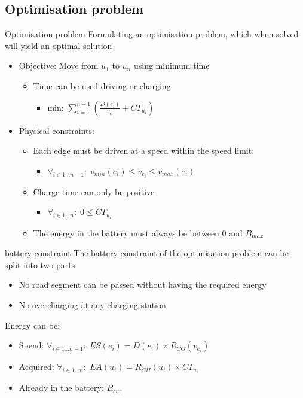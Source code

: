 \subsection{Optimisation problem}
\begin{frame}{Optimisation problem}
Formulating an optimisation problem, which when solved will yield an optimal solution
\begin{itemize}
\item Objective: Move from $u_1$ to $u_n$ using minimum time
\begin{itemize}
\item Time can be used driving or charging 
\begin{itemize}
\item $\text{min: } \sum_{i=1}^{n-1} \left(\frac{D(e_i)}{v_{e_i}} + CT_{u_i} \right)$
\end{itemize}
\end{itemize}
\item Physical constraints:
\begin{itemize}
\item Each edge must be driven at a speed within the speed limit:\begin{itemize}
\item $\forall_{i\in1 \dots n-1 }:\;v_{min}(e_i) \leq v_{e_i} \leq v_{max}(e_i)$
\end{itemize}
\item Charge time can only be positive\begin{itemize}
\item $\forall_{i\in1 \dots n }:\; 0 \leq CT_{u_i} $
\end{itemize}

\item The energy in the battery must always be between 0 and $B_{max}$
\end{itemize}
\end{itemize} 
\end{frame}
\begin{frame}{battery constraint}
The battery constraint of the optimisation problem can be split into two parts
\begin{itemize}
\item No road segment can be passed without having the required energy
\item No overcharging at any charging station 
\end{itemize}
Energy can be:
\begin{itemize}
\item Spend: $\forall_{i\in1 \dots n-1 }:\; ES(e_i) = D(e_i) \times R_{CO}(v_{e_i})$
\item Acquired: $\forall_{i\in1 \dots n }:\; EA(u_i) = R_{CH}(u_i) \times CT_{u_i}$
\item Already in the battery: $B_{cur}$
\end{itemize}
\end{frame}

